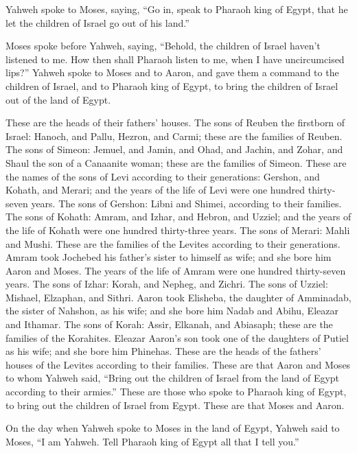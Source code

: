  Yahweh spoke to Moses, saying,  ``Go in,
speak to Pharaoh king of Egypt, that he let the children of Israel go
out of his land.''

 Moses spoke before Yahweh, saying, ``Behold, the children
of Israel haven't listened to me. How then shall Pharaoh listen to me,
when I have uncircumcised lips?''  Yahweh spoke to Moses
and to Aaron, and gave them a command to the children of Israel, and to
Pharaoh king of Egypt, to bring the children of Israel out of the land
of Egypt.

 These are the heads of their fathers' houses. The sons of
Reuben the firstborn of Israel: Hanoch, and Pallu, Hezron, and Carmi;
these are the families of Reuben.  The sons of Simeon:
Jemuel, and Jamin, and Ohad, and Jachin, and Zohar, and Shaul the son of
a Canaanite woman; these are the families of Simeon.  These
are the names of the sons of Levi according to their generations:
Gershon, and Kohath, and Merari; and the years of the life of Levi were
one hundred thirty-seven years.  The sons of Gershon: Libni
and Shimei, according to their families.  The sons of
Kohath: Amram, and Izhar, and Hebron, and Uzziel; and the years of the
life of Kohath were one hundred thirty-three years.  The
sons of Merari: Mahli and Mushi. These are the families of the Levites
according to their generations.  Amram took Jochebed his
father's sister to himself as wife; and she bore him Aaron and Moses.
The years of the life of Amram were one hundred thirty-seven years.
 The sons of Izhar: Korah, and Nepheg, and Zichri.
 The sons of Uzziel: Mishael, Elzaphan, and Sithri.
 Aaron took Elisheba, the daughter of Amminadab, the sister
of Nahshon, as his wife; and she bore him Nadab and Abihu, Eleazar and
Ithamar.  The sons of Korah: Assir, Elkanah, and Abiasaph;
these are the families of the Korahites.  Eleazar Aaron's
son took one of the daughters of Putiel as his wife; and she bore him
Phinehas. These are the heads of the fathers' houses of the Levites
according to their families.  These are that Aaron and
Moses to whom Yahweh said, ``Bring out the children of Israel from the
land of Egypt according to their armies.''  These are those
who spoke to Pharaoh king of Egypt, to bring out the children of Israel
from Egypt. These are that Moses and Aaron.

 On the day when Yahweh spoke to Moses in the land of
Egypt,  Yahweh said to Moses, ``I am Yahweh. Tell Pharaoh
king of Egypt all that I tell you.''


